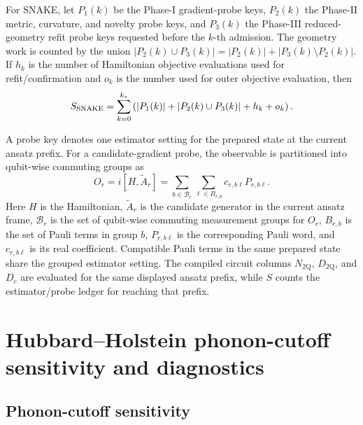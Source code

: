 \documentclass[
  reprint,
  amsmath,
  amssymb,
  aps,
  pra,
  nofootinbib,
  superscriptaddress,
  floatfix
]{revtex4-2}
\newcommand{\twq}{\mathrm{2Q}}
\begin{document}
For SNAKE, let \(P_1(k)\) be the Phase-I gradient-probe keys, \(P_2(k)\) the Phase-II metric, curvature, and novelty probe keys, and \(P_3(k)\) the Phase-III reduced-geometry refit probe keys requested before the \(k\)-th admission.  The geometry work is counted by the union \(|P_2(k)\cup P_3(k)|=|P_2(k)|+|P_3(k)\setminus P_2(k)|\).  If \(h_k\) is the number of Hamiltonian objective evaluations used for refit/confirmation and \(o_k\) is the number used for outer objective evaluation, then
\begin{equation}
S_{\rm SNAKE}
=
\sum_{k=0}^{k_\star}
\left(
|P_1(k)|+|P_2(k)\cup P_3(k)|+h_k+o_k
\right).
\label{eq:appendix_s_snake}
\end{equation}

A probe key denotes one estimator setting for the prepared state at the current ansatz prefix.  For a candidate-gradient probe, the observable is partitioned into qubit-wise commuting groups as
\begin{equation}
O_r=i[H,\widetilde A_r]
=\sum_{b\in\mathcal B_r}\sum_{\ell\in B_{r,b}}
c_{r,b\ell}P_{r,b\ell} .
\label{eq:appendix_grouped_gradient}
\end{equation}
Here \(H\) is the Hamiltonian, \(\widetilde A_r\) is the candidate generator in the current ansatz frame, \(\mathcal B_r\) is the set of qubit-wise commuting measurement groups for \(O_r\), \(B_{r,b}\) is the set of Pauli terms in group \(b\), \(P_{r,b\ell}\) is the corresponding Pauli word, and \(c_{r,b\ell}\) is its real coefficient. Compatible Pauli terms in the same prepared state share the grouped estimator setting.  The compiled circuit columns \(N_{\twq}\), \(D_{\twq}\), and \(D_c\) are evaluated for the same displayed ansatz prefix, while \(S\) counts the estimator/probe ledger for reaching that prefix.

\section{Hubbard--Holstein phonon-cutoff sensitivity and diagnostics}
\label{app:hh_stress_diagnostics}

\subsection{Phonon-cutoff sensitivity}
\label{app:hh_cutoff_sensitivity}
\end{document}
